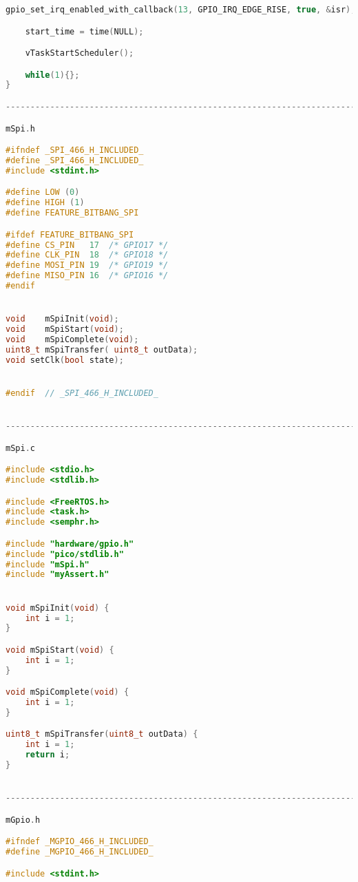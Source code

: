 \documentclass[sigconf]{article}
\begin{document}
\begin{lstlisting}[basicstyle=\footnotesize\ttfamily, language=c,breaklines]
    gpio_set_irq_enabled_with_callback(13, GPIO_IRQ_EDGE_RISE, true, &isr);

    start_time = time(NULL);

    vTaskStartScheduler();

    while(1){};
}

--------------------------------------------------------------------------------

mSpi.h

#ifndef _SPI_466_H_INCLUDED_
#define _SPI_466_H_INCLUDED_
#include <stdint.h>

#define LOW (0)
#define HIGH (1)
#define FEATURE_BITBANG_SPI

#ifdef FEATURE_BITBANG_SPI
#define CS_PIN   17  /* GPIO17 */
#define CLK_PIN  18  /* GPIO18 */
#define MOSI_PIN 19  /* GPIO19 */
#define MISO_PIN 16  /* GPIO16 */
#endif


void    mSpiInit(void);
void    mSpiStart(void);
void    mSpiComplete(void);
uint8_t mSpiTransfer( uint8_t outData);
void setClk(bool state);


#endif  // _SPI_466_H_INCLUDED_


--------------------------------------------------------------------------------

mSpi.c

#include <stdio.h>
#include <stdlib.h>

#include <FreeRTOS.h>
#include <task.h>
#include <semphr.h>

#include "hardware/gpio.h"
#include "pico/stdlib.h"
#include "mSpi.h"
#include "myAssert.h"


void mSpiInit(void) {
    int i = 1;
}

void mSpiStart(void) {
    int i = 1;
}

void mSpiComplete(void) {
    int i = 1;
}

uint8_t mSpiTransfer(uint8_t outData) {
    int i = 1;
    return i;
}


--------------------------------------------------------------------------------

mGpio.h

#ifndef _MGPIO_466_H_INCLUDED_
#define _MGPIO_466_H_INCLUDED_

#include <stdint.h>


\end{lstlisting}
\end{document}
